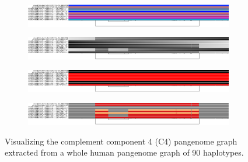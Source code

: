 \begin{figure}[h!]
    \begin{subfigure}{\linewidth}
        \caption{}
        \centering
        \includegraphics[width=1.0\linewidth, trim=0 +2cm 0 0.5cm]{fig/visualization_1D/chr6.pan.fa.c3d3224.7748b33.395c7f4.smooth.gfa.C4.sorted}
        \label{fig:odgi_viz_default}
    \end{subfigure}
    \begin{subfigure}{\linewidth}
        \caption{}
        \centering
        \includegraphics[width=1.0\linewidth, trim=0 +2cm 0 0.5cm]{fig/visualization_1D/chr6.pan.fa.c3d3224.7748b33.395c7f4.smooth.gfa.C4.sorted.du}
        \label{fig:odgi_viz_color_by_path_pos}
    \end{subfigure}
    \begin{subfigure}{\linewidth}
        \caption{}
        \centering
        \includegraphics[width=\linewidth, trim=0 +2cm 0 0.5cm]{fig/visualization_1D/chr6.pan.fa.c3d3224.7748b33.395c7f4.smooth.gfa.C4.sorted.z}
        \label{fig:odgi_viz_color_by_inversion_rate}
    \end{subfigure}
    \begin{subfigure}{1\linewidth}
        \caption{}
        \centering
        \includegraphics[width=\linewidth, trim=0 1.5cm 0 0.5cm]{fig/visualization_1D/chr6.pan.fa.c3d3224.7748b33.395c7f4.smooth.gfa.C4.sorted.m}
        \label{fig:odgi_viz_color_by_path_depth}
    \end{subfigure}
    \caption{
        Visualizing the complement component 4 (C4) pangenome graph extracted from a whole human pangenome graph of 90 haplotypes.
}
\end{figure}
